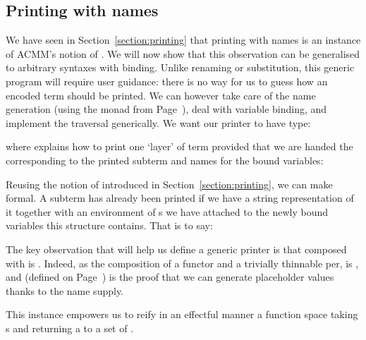 
\subsection{Printing with names}\label{section:genericprinting}

We have seen in Section~\ref{section:printing} that printing with names
is an instance of ACMM's notion of \semrec{}. We will now show that this
observation can be generalised to arbitrary syntaxes with binding. Unlike
renaming or substitution, this generic program will require user guidance:
there is no way for us to guess how an encoded term should be printed. We
can however take care of the name generation (using the  monad from Page~\pageref{section:printing}), deal with variable binding,
and implement the traversal generically. We want our printer to have type:
\begin{agdasnippet}
\end{agdasnippet}
%
where  explains how to print one `layer' of term provided that
we are handed the  corresponding to the printed subterm and
names for the bound variables:
\begin{agdasnippet}
\end{agdasnippet}
%
Reusing the notion of  introduced in Section~\ref{section:printing},
we can make  formal. A subterm has already been printed if we
have a string representation of it together with an environment of s
we have attached to the newly bound variables this structure contains.
That is to say:
%
\begin{agdasnippet}
\end{agdasnippet}
%
The key observation that will help us define a generic printer is that
 composed with  is . Indeed, as the composition
of a functor and a trivially thinnable per,  is ,
and  (defined on Page~\pageref{section:printing}) is the proof that we
can generate placeholder values thanks to the name supply.

\begin{agdasnippet}
\end{agdasnippet}

This  instance empowers us to reify in an effectful manner
a  function space taking s and returning a 
to a set of .


